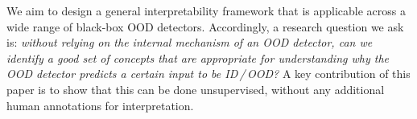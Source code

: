 


We aim to design a general interpretability framework that is applicable across a wide range of black-box OOD detectors.
Accordingly, a research question we ask is: {\em without relying on the internal mechanism of an OOD detector, can we identify a good set of concepts that are appropriate for understanding why the OOD detector predicts a certain input to be ID\,/\,OOD?} 
A key contribution of this paper is to show that this can be done unsupervised, without any additional human annotations for interpretation.
%
%
%
\iffalse

